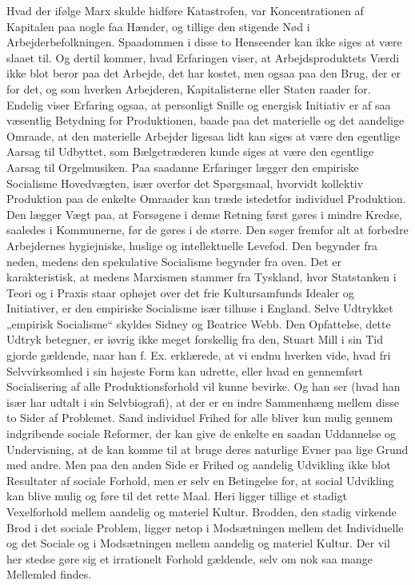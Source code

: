 \documentclass[12pt,a4paper,openany]{book}
\newcommand{\opage}[1]{\marginnote{\footnotesize\textit{[#1]}}}
\begin{document}
Hvad der ifølge Marx skulde hidføre Katastrofen, var Koncentrationen
af Kapitalen paa nogle faa Hænder, og tillige den stigende
Nød i Arbejderbefolkningen. Spaadommen i disse to Henseender kan
ikke siges at være slaaet til. Og dertil kommer, hvad Erfaringen viser,
at Arbejdsproduktets Værdi ikke blot beror paa det Arbejde, det
har kostet, men ogsaa paa den Brug, der er for det, og som hverken
Arbejderen, Kapitalisterne eller Staten raader for. Endelig viser
Erfaring ogsaa, at personligt Snille og energisk Initiativ er af saa
væsentlig Betydning for Produktionen, baade paa det materielle og
det aandelige Omraade, at den materielle Arbejder ligesaa lidt kan
siges at være den egentlige Aarsag til Udbyttet, som Bælgetræderen
kunde siges at være den egentlige Aarsag til Orgelmusiken. Paa saadanne
Erfaringer lægger den empiriske Socialisme Hovedvægten,
især overfor det Spørgsmaal, hvorvidt kollektiv Produktion paa de
enkelte Omraader kan træde istedetfor individuel Produktion. Den
lægger Vægt paa, at Forsøgene i denne Retning først gøres i mindre
Kredse, saaledes i Kommunerne, før de gøres i de større. Den søger
fremfor alt at forbedre Arbejdernes hygiejniske, huslige og intellektuelle
Levefod. Den begynder fra neden, medens den spekulative
Socialisme begynder fra oven. Det er karakteristisk, at medens
Marxismen stammer fra Tyskland, hvor Statstanken i Teori og i
Praxis staar ophøjet over det frie Kultursamfunds Idealer og Initiativer,
er den empiriske Socialisme især tilhuse i England. Selve Udtrykket
„empirisk Socialisme“ skyldes Sidney og Beatrice Webb. Den
Opfattelse, dette Udtryk betegner, er iøvrig ikke meget forskellig fra
\opage{97}den, Stuart Mill i sin Tid gjorde gældende, naar han f. Ex. erklærede,
at vi endnu hverken vide, hvad fri Selvvirksomhed i sin højeste
Form kan udrette, eller hvad en gennemført Socialisering af alle
Produktionsforhold vil kunne bevirke. Og han ser (hvad han især
har udtalt i sin Selvbiografi), at der er en indre Sammenhæng mellem
disse to Sider af Problemet. Sand individuel Frihed for alle bliver
kun mulig gennem indgribende sociale Reformer, der kan give
de enkelte en saadan Uddannelse og Undervisning, at de kan komme
til at bruge deres naturlige Evner paa lige Grund med andre. Men
paa den anden Side er Frihed og aandelig Udvikling ikke blot Resultater
af sociale Forhold, men er selv en Betingelse for, at social
Udvikling kan blive mulig og føre til det rette Maal. Heri ligger tillige
et stadigt Vexelforhold mellem aandelig og materiel Kultur.
Brodden, den stadig virkende Brod i det sociale Problem, ligger netop
i Modsætningen mellem det Individuelle og det Sociale og i Modsætningen
mellem aandelig og materiel Kultur. Der vil her stedse
gøre sig et irrationelt Forhold gældende, selv om nok saa mange
Mellemled findes.
\end{document}
